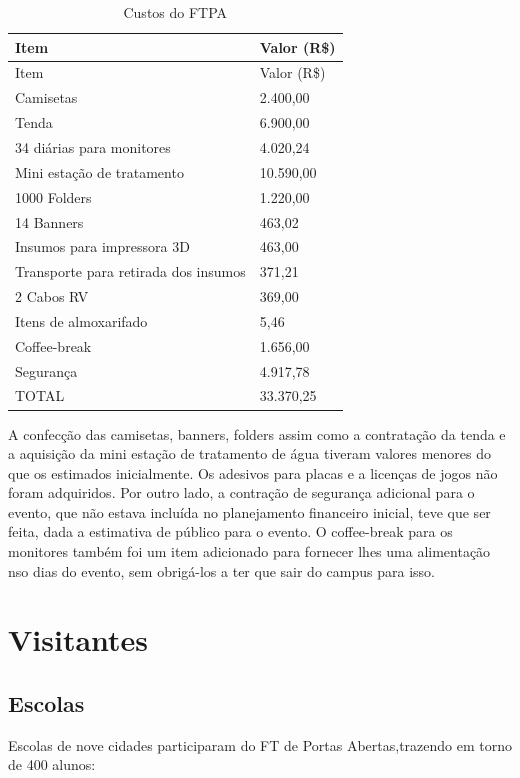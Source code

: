\documentclass[
  letterpaper,
  DIV=11,
  numbers=noendperiod]{scrreprt}
\begin{document}
\begin{longtable}[]{@{}ll@{}}
\caption{Custos do FTPA}\tabularnewline
\toprule\noalign{}
Item & Valor (R\$) \\
\midrule\noalign{}
\endfirsthead
\toprule\noalign{}
Item & Valor (R\$) \\
\midrule\noalign{}
\endhead
\bottomrule\noalign{}
\endlastfoot
50 Camisetas & 2.400,00 \\
Tenda & 6.900,00 \\
34 diárias para monitores & 4.020,24 \\
Mini estação de tratamento & 10.590,00 \\
1000 Folders & 1.220,00 \\
14 Banners & 463,02 \\
Insumos para impressora 3D & 463,00 \\
Transporte para retirada dos insumos & 371,21 \\
2 Cabos RV & 369,00 \\
Itens de almoxarifado & 5,46 \\
Coffee-break & 1.656,00 \\
Segurança & 4.917,78 \\
TOTAL & 33.370,25 \\
\end{longtable}

A confecção das camisetas, banners, folders assim como a contratação da
tenda e a aquisição da mini estação de tratamento de água tiveram
valores menores do que os estimados inicialmente. Os adesivos para
placas e a licenças de jogos não foram adquiridos. Por outro lado, a
contração de segurança adicional para o evento, que não estava incluída
no planejamento financeiro inicial, teve que ser feita, dada a
estimativa de público para o evento. O coffee-break para os monitores
também foi um item adicionado para fornecer lhes uma alimentação nso
dias do evento, sem obrigá-los a ter que sair do campus para isso.


\chapter{Visitantes}\label{visitantes}

\section{Escolas}\label{escolas-1}

Escolas de nove cidades participaram do FT de Portas Abertas,trazendo em
torno de 400 alunos:
\end{document}
